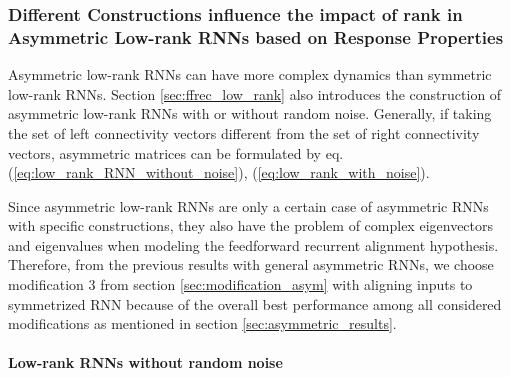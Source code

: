 \documentclass[11pt]{article}
\begin{document}
	\vspace{0.5cm}
	\subsubsection{Different Constructions influence the impact of rank in Asymmetric Low-rank RNNs based on Response Properties}
	
	Asymmetric low-rank RNNs can have more complex dynamics than symmetric low-rank RNNs. Section \ref{sec:ffrec_low_rank} also introduces the construction of asymmetric low-rank RNNs with or without random noise. Generally, if taking the set of left connectivity vectors different from the set of right connectivity vectors, asymmetric matrices can be formulated by eq.(\ref{eq:low_rank_RNN_without_noise}), (\ref{eq:low_rank_with_noise}). 
	
	Since asymmetric low-rank RNNs are only a certain case of asymmetric RNNs with specific constructions, they also have the problem of complex eigenvectors and eigenvalues when modeling the feedforward recurrent alignment hypothesis. Therefore, from the previous results with general asymmetric RNNs, we choose modification 3 from section \ref{sec:modification_asym} with aligning inputs to symmetrized RNN because of the overall best performance among all considered modifications as mentioned in section \ref{sec:asymmetric_results}.
	
	\newpage
	\paragraph{Low-rank RNNs without random noise}
	
\end{document}
